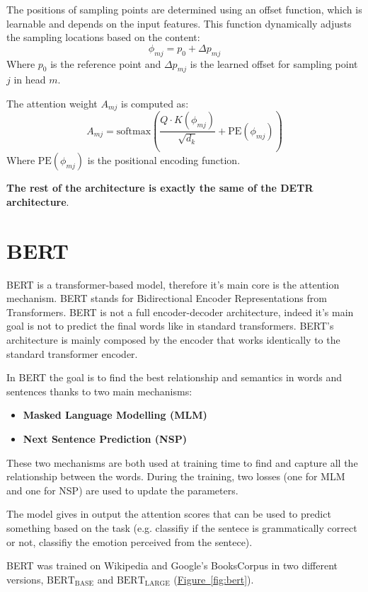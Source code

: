 \documentclass[12pt]{article}
\begin{document}
The positions of sampling points are determined using an offset function, which is learnable and depends on 
the input features. This function dynamically adjusts the sampling locations based on the content:
\begin{equation}
    \phi_{mj} = p_0 + \Delta p_{mj}
\end{equation}
Where $p_0$ is the reference point and $\Delta p_{mj}$ is the learned offset for sampling point $j$ 
in head $m$.

The attention weight $A_{mj}$ is computed as:
\begin{equation}
    A_{mj} = \text{softmax}\left(\frac{Q \cdot K(\phi_{mj})}{\sqrt{d_k}} + \text{PE}(\phi_{mj})\right)
\end{equation}
Where $\text{PE}(\phi_{mj})$ is the positional encoding function.

\textbf{The rest of the architecture is exactly the same of the DETR architecture}.

\section{BERT}
BERT is a transformer-based model, therefore it's main core is the attention 
mechanism. BERT stands for Bidirectional Encoder Representations from Transformers.
BERT is not a full encoder-decoder architecture, indeed it's main goal is not 
to predict the final words like in standard transformers. BERT's architecture
is mainly composed by the encoder that works identically to the standard
transformer encoder.

In BERT the goal is to find the best relationship and semantics in words and
sentences thanks to two main mechanisms: 
\begin{itemize}
    \item \textbf{Masked Language Modelling (MLM)}
    \item \textbf{Next Sentence Prediction (NSP)}
\end{itemize}

These two mechanisms are both used at training time to find and capture 
all the relationship between the words. During the training, two losses 
(one for MLM and one for NSP) are used to update the parameters.

The model gives in output the attention scores that can be used to predict 
something based on the task (e.g. classifiy if the sentece is grammatically 
correct or not, classifiy the emotion perceived from the sentece).

BERT was trained on Wikipedia and Google's BooksCorpus in two different versions,
$\text{BERT}_\text{BASE}$ and $\text{BERT}_\text{LARGE}$ (\hyperref[fig:bert]{Figure~\ref*{fig:bert}}).
\end{document}

